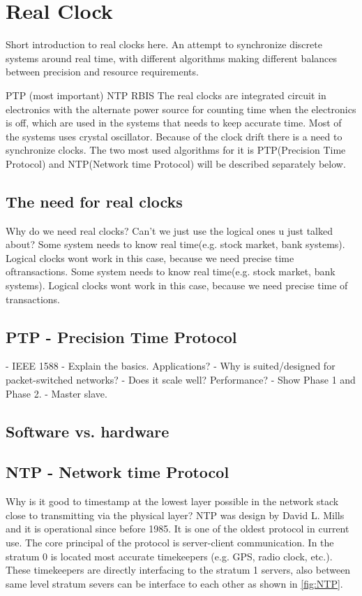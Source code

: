 \section{Real Clock}\label{sc:realClock}

Short introduction to real clocks here.
An attempt to synchronize discrete systems around real time, with different algorithms making different balances between precision and resource requirements.

PTP (most important)
NTP
RBIS
The real clocks are integrated circuit in electronics with the alternate power source for counting time when the electronics is off, which are used in the systems that needs to keep accurate time. Most of the systems uses crystal oscillator. Because of the clock drift there is a need to synchronize clocks. The two most used algorithms for it is PTP(Precision Time Protocol) and NTP(Network time Protocol) will be described separately below.

\subsection{The need for real clocks}

Why do we need real clocks? Can't we just use the logical ones u just talked about?
Some system needs to know real time(e.g. stock market, bank systems). Logical clocks wont work in this case, because we need precise time oftransactions.
Some system needs to know real time(e.g. stock market, bank systems). Logical clocks wont work in this
case, because we need precise time of transactions.


\subsection{PTP - Precision Time Protocol}

- IEEE 1588
- Explain the basics. Applications?
- Why is suited/designed for packet-switched networks?
- Does it scale well? Performance?
- Show Phase 1 and Phase 2.
- Master slave.

\subsection{Software vs. hardware}
\subsection{NTP - Network time Protocol}

Why is it good to timestamp at the lowest layer possible in the network stack close to transmitting via the physical layer?
NTP was design by David L. Mills and it is operational since before 1985. It is one of the oldest protocol in
current use. The core principal of the protocol is server-client communication. In the stratum 0 is located
most accurate timekeepers (e.g. GPS, radio clock, etc.). These timekeepers are directly interfacing to the
stratum 1 servers, also between same level stratum severs can be interface to each other as shown in \ref{fig:NTP}.

